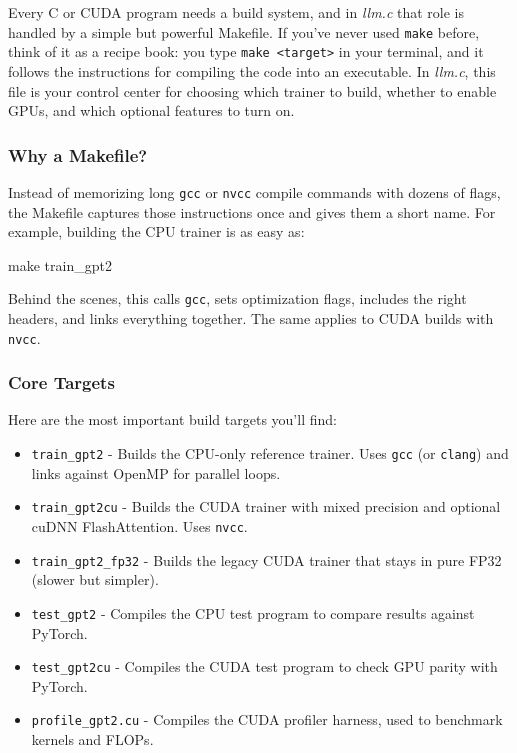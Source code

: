 \documentclass[
  letterpaper,
  DIV=11,
  numbers=noendperiod]{scrreprt}
\newenvironment{Shaded}{\begin{snugshade}}{\end{snugshade}}
\newcommand{\FunctionTok}[1]{\textcolor[rgb]{0.28,0.35,0.67}{#1}}
\newcommand{\NormalTok}[1]{\textcolor[rgb]{0.00,0.23,0.31}{#1}}
\providecommand{\tightlist}{%
  \setlength{\itemsep}{0pt}\setlength{\parskip}{0pt}}
\begin{document}
Every C or CUDA program needs a build system, and in \emph{llm.c} that
role is handled by a simple but powerful Makefile. If you've never used
\texttt{make} before, think of it as a recipe book: you type
\texttt{make\ \textless{}target\textgreater{}} in your terminal, and it
follows the instructions for compiling the code into an executable. In
\emph{llm.c}, this file is your control center for choosing which
trainer to build, whether to enable GPUs, and which optional features to
turn on.

\subsubsection{Why a Makefile?}\label{why-a-makefile}

Instead of memorizing long \texttt{gcc} or \texttt{nvcc} compile
commands with dozens of flags, the Makefile captures those instructions
once and gives them a short name. For example, building the CPU trainer
is as easy as:

\begin{Shaded}
\begin{Highlighting}[]
\FunctionTok{make}\NormalTok{ train\_gpt2}
\end{Highlighting}
\end{Shaded}

Behind the scenes, this calls \texttt{gcc}, sets optimization flags,
includes the right headers, and links everything together. The same
applies to CUDA builds with \texttt{nvcc}.

\subsubsection{Core Targets}\label{core-targets}

Here are the most important build targets you'll find:

\begin{itemize}
\tightlist
\item
  \texttt{train\_gpt2} - Builds the CPU-only reference trainer. Uses
  \texttt{gcc} (or \texttt{clang}) and links against OpenMP for parallel
  loops.
\item
  \texttt{train\_gpt2cu} - Builds the CUDA trainer with mixed precision
  and optional cuDNN FlashAttention. Uses \texttt{nvcc}.
\item
  \texttt{train\_gpt2\_fp32} - Builds the legacy CUDA trainer that stays
  in pure FP32 (slower but simpler).
\item
  \texttt{test\_gpt2} - Compiles the CPU test program to compare results
  against PyTorch.
\item
  \texttt{test\_gpt2cu} - Compiles the CUDA test program to check GPU
  parity with PyTorch.
\item
  \texttt{profile\_gpt2.cu} - Compiles the CUDA profiler harness, used
  to benchmark kernels and FLOPs.
\end{itemize}
\end{document}
